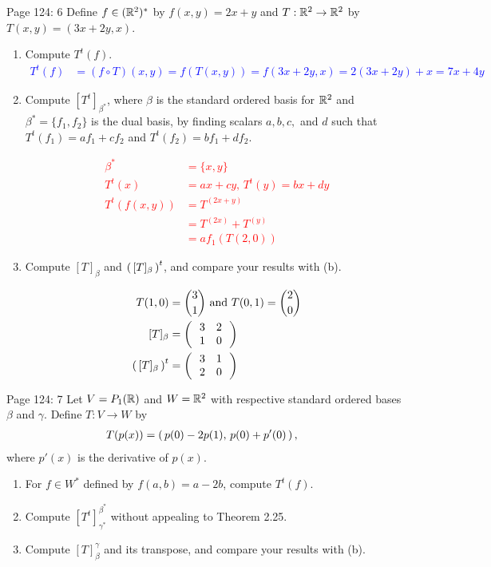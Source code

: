 \documentclass[10pt,a4paper]{report}
\newcommand{\RED}[1]{\textcolor{red}{#1}}
\newcommand{\BLUE}[1]{\textcolor{blue}{#1}}
\begin{document}
\noindent Page 124: 6 Define $f \in (\mathbb{R}^2)^*$ by $f(x,y)=2x+y$ and $T: \mathbb{R}^2\to \mathbb{R}^2$ by $T(x,y) = (3x+2y,x)$.
\begin{enumerate}[label=(\alph*)]
\item Compute $T^t(f)$.
\BLUE{\begin{align*}
	T^t(f) &= (f\circ T)(x,y) =f(T(x,y))=f(3x+2y,x) = 2(3x+2y)+x = 7x+4y
\end{align*}
}

\item Compute $[T^t]_{\beta^*}$, where $\beta$ is the standard ordered basis for $\mathbb{R}^2$ and $\beta^*=\{f_1,f_2\}$ is the dual basis, by finding scalars $a,b,c,$ and $d$ such that $T^t(f_1)=af_1+cf_2$ and $T^t(f_2)=bf_1+df_2$.

\RED{\begin{align*}
	\beta^* &= \{ x, y\}\\
	T^t(x) &= ax+cy, \, T^t(y) = bx+dy \\
	T^t(f(x,y)) &= T^(2x+y) \\
		&= T^(2x)+T^(y) \\
		&= af_1(T(2,0))
\end{align*}
}

\item Compute $[T]_\beta$ and $\left (\, [T]_\beta \,\right )^t$, and compare your results with (b).

\BLUE{\begin{align*}
	T(1,0) &= \binom{3}{1} \text{ and } T(0,1) = \binom{2}{0}\\
	[T]_\beta &= \left (\,  \begin{array}{c c} 3&2 \\ 1 & 0 \end{array}  \,\right ) \\
	\left (\, [T]_\beta \,\right )^t &= \left (\,  \begin{array}{c c} 3&1 \\ 2 & 0 \end{array}  \,\right )
\end{align*}
}
\end{enumerate} 

\noindent Page 124: 7 Let $V=P_1(\mathbb{R})$ and $W=\mathbb{R}^2$ with respective standard ordered bases $\beta$ and $\gamma$.  Define $T:V\to W$ by
\begin{align*}
	T(p(x))&= \left (\, p(0)-2p(1),\,p(0)+p'(0) \,\right ),
\end{align*}where $p'(x)$ is the derivative of $p(x)$.
\begin{enumerate}
	\item For $f \in W^*$ defined by $f(a,b)=a-2b$, compute $T^t(f)$.
	\item Compute $[T^t]_{\gamma^*}^{\beta^*}$ without appealing to Theorem 2.25.
	\item Compute $[T]_\beta^\gamma$ and its transpose, and compare your results with (b).
	
\end{enumerate}
\end{document}
